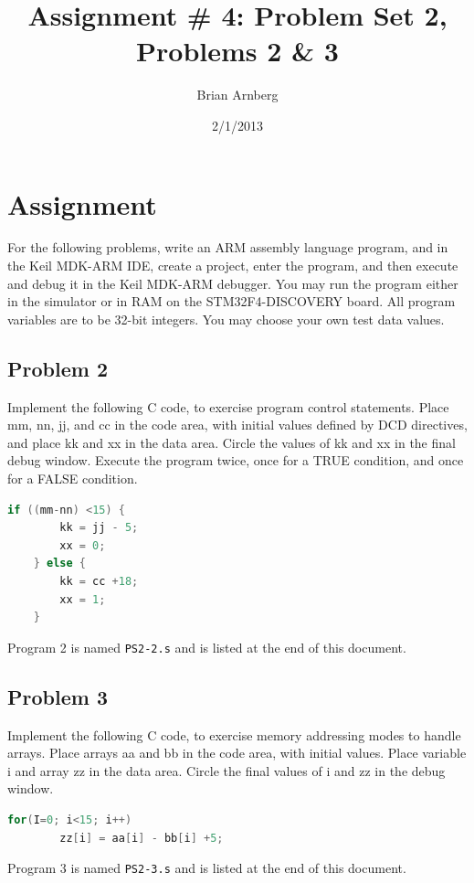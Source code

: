 \documentclass{article}
\title{Assignment \# 4: Problem Set 2, Problems 2 \& 3}
\date{2/1/2013}
\author{Brian Arnberg}
\begin{document}
\label{start}

	\maketitle
	\thispagestyle{empty}


\section*{Assignment}

For the following problems, write an ARM assembly language program, and in the Keil MDK-ARM
IDE, create a project, enter the program, and then execute and debug it in the Keil
MDK-ARM debugger. You may run the program either in the simulator or in RAM on the
STM32F4-DISCOVERY board. All program variables are to be 32-bit integers. You may choose
your own test data values.\\

\subsection*{Problem 2} Implement the following C code, to exercise program control statements. Place mm, nn, jj, and cc in the code area, with initial values defined by DCD directives, and place kk and xx in the data area. Circle the values of kk and xx in the final debug window. Execute the program twice, once for a TRUE condition, and once for a FALSE condition. 
\begin{lstlisting}[language=C, frame=none, numbers=none ]
	if ((mm-nn) <15) {
		kk = jj - 5;
		xx = 0;
	} else {
		kk = cc +18;
		xx = 1;
	}
 \end{lstlisting}
Program 2 is named \texttt{PS2-2.s} and is listed at the end of this document. 

\subsection*{Problem 3} Implement the following C code, to exercise memory addressing modes to handle arrays. Place arrays aa and bb in the code area, with initial values. Place variable i and array zz in the data area. Circle the final values of i and zz in the debug window. 
\begin{lstlisting}[language=C, frame=none, numbers=none ]
	for(I=0; i<15; i++)
		zz[i] = aa[i] - bb[i] +5;
 \end{lstlisting}
Program 3 is named \texttt{PS2-3.s} and is listed at the end of this document. 
\end{document}
